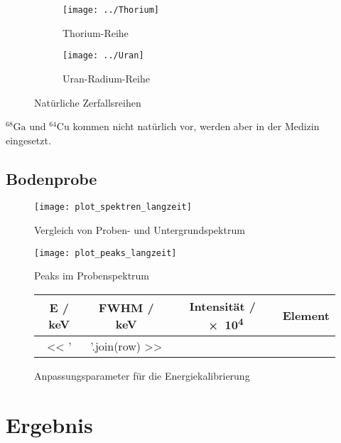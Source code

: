 \documentclass[11pt, ngerman, fleqn, DIV=15, headinclude, BCOR=2cm]{scrreprt}
\newcommand{\plotwidth}{0.8\linewidth}
\begin{document}
\begin{figure}
    \centering
    \begin{subfigure}[b]{0.48\linewidth}
    \centering
    \texttt{[image: ../Thorium]}
    \caption{%
        Thorium-Reihe
        \parencite{thorium}
    }
    \label{fig:thorium}
    \end{subfigure}
    \hfill
    \begin{subfigure}[b]{0.48\linewidth}
    \centering
    \texttt{[image: ../Uran]}
    \caption{%
        Uran-Radium-Reihe
        \parencite{uran}
    }
    \label{fig:uran}
    \end{subfigure}
    \caption{%
        Natürliche Zerfallsreihen
    }
    \label{fig:}
\end{figure}

$^{68}\text{Ga}$ und $^{64}\text{Cu}$ kommen nicht natürlich vor, werden aber
in der Medizin eingesetzt.


\section{Bodenprobe}


\begin{figure}
	\centering
	\texttt{[image: plot\_spektren\_langzeit]}
	\caption{%
		Vergleich von Proben- und Untergrundspektrum
	}
	\label{fig:langzeit_probe_untergrund}
\end{figure}


\begin{figure}
	\centering
	\texttt{[image: plot\_peaks\_langzeit]}
	\caption{%
		Peaks im Probenspektrum
	}
	\label{fig:langzeit_probe_peaks}
\end{figure}



\begin{figure}[h]
	\centering
	\begin{tabular}{SSSl}
		{E / \si{\kilo\electronvolt}} &
		{FWHM / \si{\kilo\electronvolt}} &
            {Intensität / \num{e4}} &
            {Element}\\
		\midrule
		<< ' & '.join(row) >> \\
	\end{tabular}
	\caption{%
		Anpassungsparameter für die Energiekalibrierung
	}
	\label{tab:energiekalibrierung}
\end{figure}


\chapter{Ergebnis}
\end{document}
